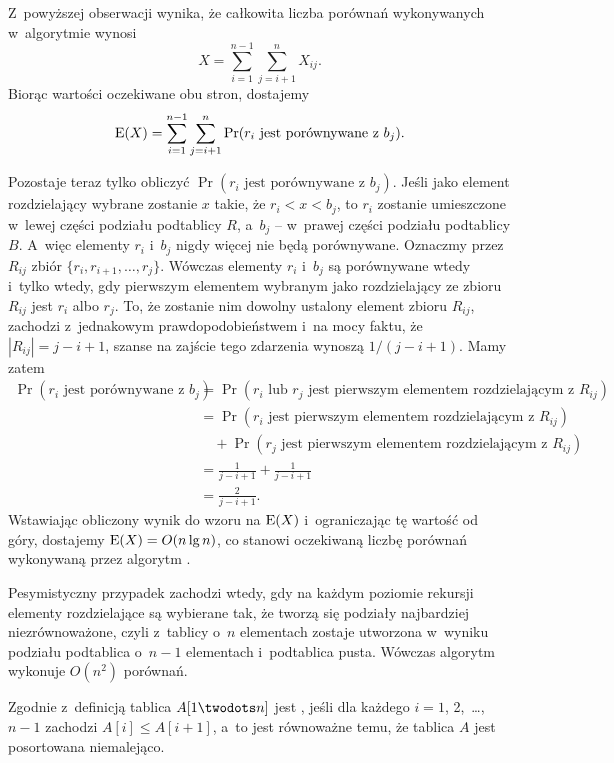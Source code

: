 Z~powyższej obserwacji wynika, że całkowita liczba porównań wykonywanych w~algorytmie wynosi
\[
    X = \sum_{i=1}^{n-1}\sum_{j=i+1}^nX_{ij}.
\]
Biorąc wartości oczekiwane obu stron, dostajemy
\[
    \operatorname{E}(X) = \sum_{i=1}^{n-1}\sum_{j=i+1}^n\Pr(\text{$r_i$ jest porównywane z~$b_j$}).
\]

Pozostaje teraz tylko obliczyć $\Pr(\text{$r_i$ jest porównywane z~$b_j$})$.
Jeśli jako element rozdzielający wybrane zostanie $x$ takie, że $r_i<x<b_j$, to $r_i$ zostanie umieszczone w~lewej części podziału podtablicy $R$, a~$b_j$ -- w~prawej części podziału podtablicy $B$.
A~więc elementy $r_i$ i~$b_j$ nigdy więcej nie będą porównywane.
Oznaczmy przez $R_{ij}$ zbiór $\{r_i,r_{i+1},\dots,r_j\}$.
Wówczas elementy $r_i$ i~$b_j$ są porównywane wtedy i~tylko wtedy, gdy pierwszym elementem wybranym jako rozdzielający ze zbioru $R_{ij}$ jest $r_i$ albo $r_j$.
To, że zostanie nim dowolny ustalony element zbioru $R_{ij}$, zachodzi z~jednakowym prawdopodobieństwem i~na mocy faktu, że $|R_{ij}|=j-i+1$, szanse na zajście tego zdarzenia wynoszą $1/(j-i+1)$.
Mamy zatem
\begin{align*}
    \Pr(\text{$r_i$ jest porównywane z~$b_j$}) &= \Pr(\text{$r_i$ lub $r_j$ jest pierwszym elementem rozdzielającym z~$R_{ij}$}) \\
	&= \Pr(\text{$r_i$ jest pierwszym elementem rozdzielającym z~$R_{ij}$}) \\
	&\quad {}+\Pr(\text{$r_j$ jest pierwszym elementem rozdzielającym z~$R_{ij}$}) \\
	&= \frac{1}{j-i+1}+\frac{1}{j-i+1} \\
	&= \frac{2}{j-i+1}.
\end{align*}
Wstawiając obliczony wynik do wzoru na $\operatorname{E}(X)$ i~ograniczając tę wartość od góry, dostajemy $\operatorname{E}(X)=O(n\lg n)$, co stanowi oczekiwaną liczbę porównań wykonywaną przez algorytm .

Pesymistyczny przypadek zachodzi wtedy, gdy na każdym poziomie rekursji elementy rozdzielające są wybierane tak, że tworzą się podziały najbardziej niezrównoważone, czyli z~tablicy o~$n$ elementach zostaje utworzona w~wyniku podziału podtablica o~$n-1$ elementach i~podtablica pusta.
Wówczas algorytm wykonuje $O(n^2)$ porównań.


\subproblem %
Zgodnie z~definicją tablica $A[1\twodots n]$ jest , jeśli dla każdego $i=1$, 2,~\dots,~$n-1$ zachodzi $A[i]\le A[i+1]$, a~to jest równoważne temu, że tablica $A$ jest posortowana niemalejąco.

